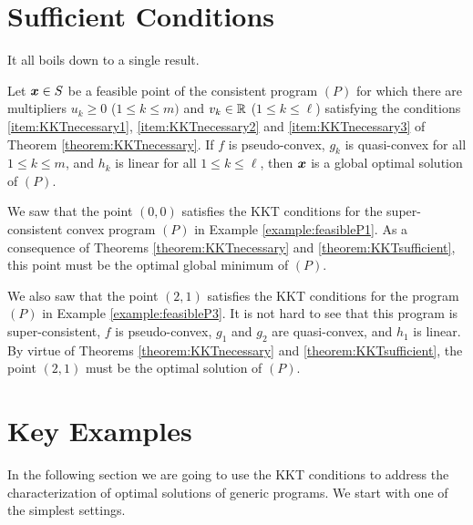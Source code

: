 
\section{Sufficient Conditions}

It all boils down to a single result.

\begin{theorem}\label{theorem:KKTsufficient}
Let $\boldsymbol{x} \in S$ be a feasible point of the consistent program $(P)$ for which there are multipliers $u_k \geq 0$ ($1\leq k \leq m)$ and $v_k \in \mathbb{R}$ ($1\leq k \leq \ell$) satisfying the conditions \ref{item:KKTnecessary1}, \ref{item:KKTnecessary2} and \ref{item:KKTnecessary3} of Theorem \ref{theorem:KKTnecessary}. If $f$ is pseudo-convex, $g_k$ is quasi-convex for all $1\leq k \leq m$, and $h_k$ is linear for all $1\leq k \leq \ell$, then $\boldsymbol{x}$ is a global optimal solution of $(P)$.
\end{theorem}

\begin{example}
We saw that the point $(0,0)$ satisfies the KKT conditions for the super-consistent convex program $(P)$ in Example \ref{example:feasibleP1}.  As a consequence of Theorems \ref{theorem:KKTnecessary} and \ref{theorem:KKTsufficient}, this point must be the optimal global minimum of $(P)$.

We also saw that the point $(2,1)$ satisfies the KKT conditions for the program $(P)$ in Example \ref{example:feasibleP3}.  It is not hard to see that this program is super-consistent, $f$ is pseudo-convex, $g_1$ and $g_2$ are quasi-convex, and $h_1$ is linear.  By virtue of Theorems \ref{theorem:KKTnecessary} and \ref{theorem:KKTsufficient}, the point $(2,1)$ must be the optimal solution of $(P)$.
\end{example}

\section*{Key Examples}
In the following section we are going to use the KKT conditions to address the characterization of optimal solutions of generic programs.  We start with one of the simplest settings.


